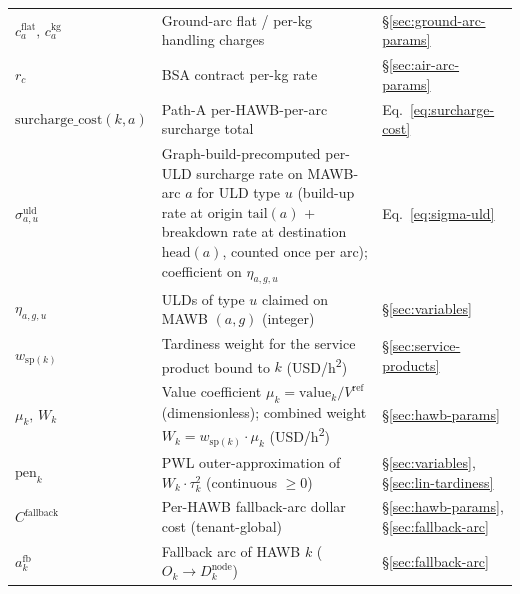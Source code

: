 \documentclass[11pt,a4paper]{article}
\theoremstyle{definition}
\begin{document}
\begin{table}[H]
\begin{tabular}{lp{9cm}p{3.5cm}}
$c_a^{\text{flat}},\, c_a^{\text{kg}}$ & Ground-arc flat / per-kg handling charges & \S\ref{sec:ground-arc-params} \\
$r_c$ & BSA contract per-kg rate & \S\ref{sec:air-arc-params} \\
$\text{surcharge\_cost}(k, a)$ & Path-A per-HAWB-per-arc surcharge total & Eq.~\ref{eq:surcharge-cost} \\
$\sigma^{\text{uld}}_{a,u}$ & Graph-build-precomputed per-ULD surcharge rate on MAWB-arc $a$ for ULD type $u$ (build-up rate at origin $\text{tail}(a)$ + breakdown rate at destination $\text{head}(a)$, counted once per arc); coefficient on $\eta_{a,g,u}$ & Eq.~\ref{eq:sigma-uld} \\
$\eta_{a,g,u}$ & ULDs of type $u$ claimed on MAWB $(a,g)$ (integer) & \S\ref{sec:variables} \\
$w_{\text{sp}(k)}$ & Tardiness weight for the service product bound to $k$ (USD/h\textsuperscript{2}) & \S\ref{sec:service-products} \\
$\mu_k,\, W_k$ & Value coefficient $\mu_k = \text{value}_k / V^{\text{ref}}$ (dimensionless); combined weight $W_k = w_{\text{sp}(k)} \cdot \mu_k$ (USD/h\textsuperscript{2}) & \S\ref{sec:hawb-params} \\
$\text{pen}_k$ & PWL outer-approximation of $W_k \cdot \tau_k^2$ (continuous $\geq 0$) & \S\ref{sec:variables}, \S\ref{sec:lin-tardiness} \\
$C^{\text{fallback}}$ & Per-HAWB fallback-arc dollar cost (tenant-global) & \S\ref{sec:hawb-params}, \S\ref{sec:fallback-arc} \\
$a^{\text{fb}}_k$ & Fallback arc of HAWB $k$ ($O_k \to D_k^{\text{node}}$) & \S\ref{sec:fallback-arc} \\
\bottomrule
\end{tabular}
\end{table}
\end{document}
